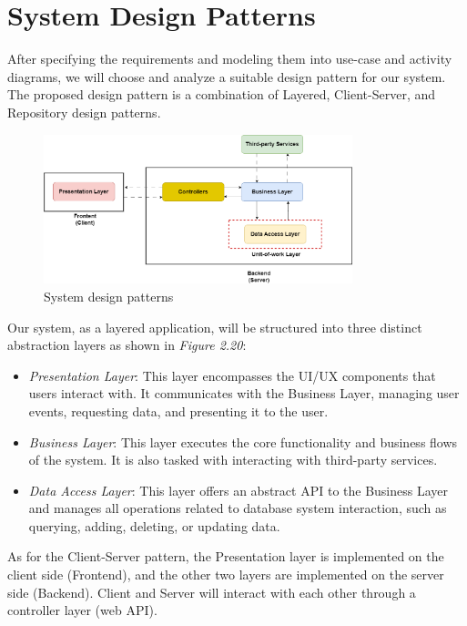 \section{System Design Patterns}

After specifying the requirements and modeling them into use-case and activity diagrams, we will choose and analyze a suitable design pattern for our system. The proposed design pattern is a combination of Layered, Client-Server, and Repository design patterns.

\begin{figure}[H]
    \centering
    \includegraphics[width=0.8\textwidth]{Figures/design_pattern.png}
    \caption{System design patterns}
\end{figure}

Our system, as a layered application, will be structured into three distinct abstraction layers as shown in \textit{Figure 2.20}:


\begin{itemize}
    \item
          \emph{Presentation Layer}: This layer encompasses the UI/UX components that users interact with. It communicates with the Business Layer, managing user events, requesting data, and presenting it to the user.
    \item
          \emph{Business Layer}: This layer executes the core functionality and business flows of the system. It is also tasked with interacting with third-party services.
    \item
          \emph{Data Access Layer}: This layer offers an abstract API to the Business Layer and manages all operations related to database system interaction, such as querying, adding, deleting, or updating data.
\end{itemize}

As for the Client-Server pattern, the Presentation layer is implemented on the client side (Frontend), and the other two layers are implemented on the server side (Backend). Client and Server will interact with each other through a controller layer (web API).

